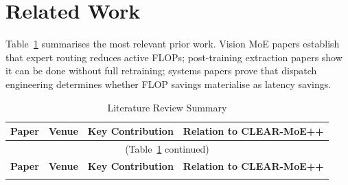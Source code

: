 \documentclass[12pt,a4paper]{article}
\begin{document}
\section{Related Work}
\label{sec:related}

Table~\ref{tab:litreview} summarises the most relevant prior work. Vision MoE papers establish that expert routing reduces active FLOPs; post-training extraction papers show it can be done without full retraining; systems papers prove that dispatch engineering determines whether FLOP savings materialise as latency savings.

\begin{longtable}{p{3.0cm}p{2.0cm}p{4.5cm}p{4.5cm}}
\caption{Literature Review Summary\label{tab:litreview}} \\
\toprule
\textbf{Paper} & \textbf{Venue} & \textbf{Key Contribution} & \textbf{Relation to CLEAR-MoE++} \\
\midrule
\endfirsthead
\multicolumn{4}{c}{\footnotesize(Table~\ref{tab:litreview} continued)} \\
\toprule
\textbf{Paper} & \textbf{Venue} & \textbf{Key Contribution} & \textbf{Relation to CLEAR-MoE++} \\
\midrule
\endhead
\bottomrule
\endfoot


\end{longtable}
\end{document}

